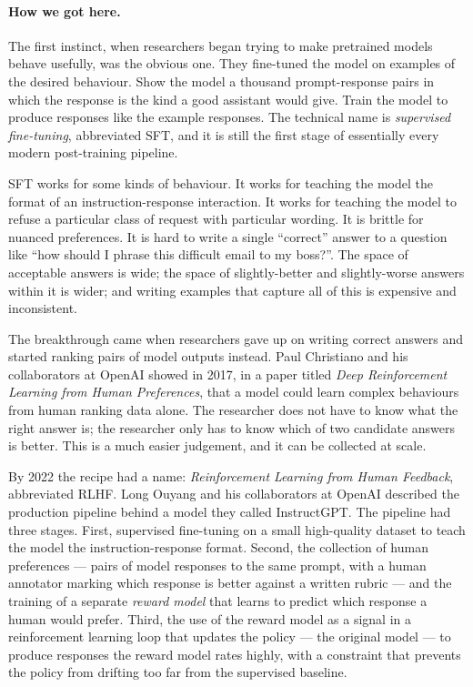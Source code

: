 \paragraph{How we got here.} The first instinct, when researchers began trying to make
pretrained models behave usefully, was the obvious one. They
fine-tuned the model on examples of the desired behaviour.
Show the model a thousand prompt-response pairs in which the
response is the kind a good assistant would give. Train the
model to produce responses like the example responses. The
technical name is \emph{supervised fine-tuning}, abbreviated
SFT, and it is still the first stage of essentially every
modern post-training pipeline.

SFT works for some kinds of behaviour. It works for teaching
the model the format of an instruction-response interaction.
It works for teaching the model to refuse a particular class
of request with particular wording. It is brittle for
nuanced preferences. It is hard to write a single ``correct''
answer to a question like ``how should I phrase this difficult
email to my boss?''. The space of acceptable answers is wide;
the space of slightly-better and slightly-worse answers within
it is wider; and writing examples that capture all of this is
expensive and inconsistent.

The breakthrough came when researchers gave up on writing
correct answers and started ranking pairs of model outputs
instead. Paul Christiano and his collaborators at OpenAI
showed in 2017, in a paper titled \emph{Deep Reinforcement
Learning from Human Preferences}, that a model could learn
complex behaviours from human ranking data alone. The
researcher does not have to know what the right answer is; the
researcher only has to know which of two candidate answers is
better. This is a much easier judgement, and it can be
collected at scale.

By 2022 the recipe had a name: \emph{Reinforcement Learning
from Human Feedback}, abbreviated RLHF. Long Ouyang and his
collaborators at OpenAI described the production pipeline
behind a model they called InstructGPT. The pipeline had three
stages. First, supervised fine-tuning on a small high-quality
dataset to teach the model the instruction-response format.
Second, the collection of human preferences --- pairs of model
responses to the same prompt, with a human annotator marking
which response is better against a written rubric --- and the
training of a separate \emph{reward model} that learns to
predict which response a human would prefer. Third, the use of
the reward model as a signal in a reinforcement learning loop
that updates the policy --- the original model --- to produce
responses the reward model rates highly, with a constraint
that prevents the policy from drifting too far from the
supervised baseline.

